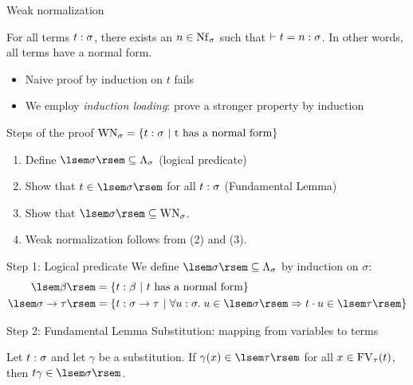 \documentclass{beamer}
\begin{document}
\begin{frame}{Weak normalization}
\begin{thm}
For all terms $\typedtm{t}{\sigma}$, there exists an $n \in \Nf[\sigma]$ such that $\conv{t}{n}{\sigma}$. In other words, all terms have a normal form.
\end{thm}
\begin{itemize}
    \item Naive proof by induction on $t$ fails
    \item We employ \textit{induction loading}: prove a stronger property by induction
\end{itemize}
\end{frame}

\begin{frame}{Steps of the proof}
$\mathrm{WN}_\sigma = \setof{\typedtm{t}{\sigma}}{\text{t has a normal form}}$
\begin{enumerate}
    \item Define $\sem{\sigma} \subs \Tm[\sigma]$ (logical predicate)
    \item Show that $t \in \sem{\sigma}$ for all $\typedtm{t}{\sigma}$ (Fundamental Lemma)
    \item Show that $\sem{\sigma} \subs \mathrm{WN}_\sigma$.
    \item Weak normalization follows from (2) and (3).
\end{enumerate}
\end{frame}

\begin{frame}{Step 1: Logical predicate}
We define $\sem{\sigma} \subs \Tm[\sigma]$ by induction on $\sigma$:
\begin{align*}
\sem{\beta} &= \setof{\typedtm{t}{\beta}}{t\text{ has a normal form}} \\
\sem{\functy{\sigma}{\tau}} &= \setof{\typedtm{t}{\functy{\sigma}{\tau}}}{\forall \typedtm{u}{\sigma}.\;u \in \sem{\sigma} \implies \app{t}{u} \in \sem{\tau}}
\end{align*}
\end{frame}

\begin{frame}{Step 2: Fundamental Lemma}
Substitution: mapping from variables to terms
\begin{lem}
Let $\typedtm{t}{\sigma}$ and let $\gamma$ be a substitution. If $\gamma(x) \in \sem{\tau}$ for all $x \in \FV[\tau]{t}$, then $\subst{t}{\gamma} \in \sem{\sigma}$.
\end{lem}
\end{frame}
\end{document}

